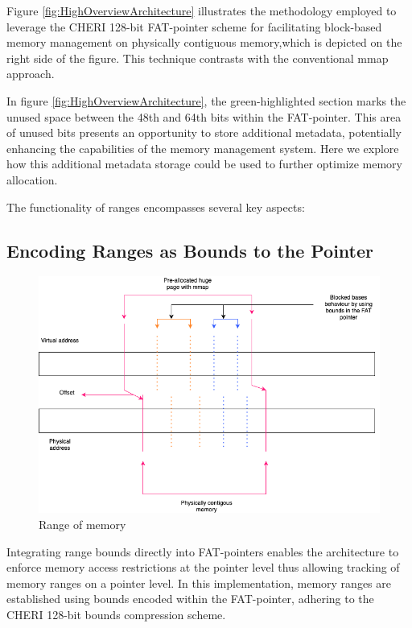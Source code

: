 \documentclass[11pt]{article}
\begin{document}
Figure \ref{fig:HighOverviewArchitecture} illustrates
the methodology employed to leverage the CHERI 
128-bit FAT-pointer scheme for facilitating
block-based memory management on physically
contiguous memory,which is depicted on the
right side of the figure. 
This technique contrasts with the
conventional mmap approach.

In figure \ref{fig:HighOverviewArchitecture}, the green-highlighted
section marks the unused space between the 48th and 64th bits
within the FAT-pointer. This area of unused bits
presents an opportunity to store additional metadata,
potentially enhancing the capabilities of the
memory management system. 
Here we explore how this additional
metadata storage could be used to further
optimize memory allocation.

The functionality of ranges encompasses
several key aspects:

\subsection{Encoding Ranges as Bounds to the Pointer}
\label{sec:org35c3d2b}
\begin{figure}[htbp]
\centering
\includegraphics[width=.9\linewidth]{diagram/AllocationOverview24.png}
\caption{\label{fig:org4c237f8}Range of memory}
\end{figure}

Integrating range bounds directly into FAT-pointers enables the architecture 
to enforce memory access restrictions at the pointer level thus allowing 
tracking of memory ranges on a pointer level. In this implementation, memory ranges are established using
bounds encoded within the FAT-pointer, adhering to the CHERI
128-bit bounds compression scheme\cite{woodruff_cheri_2019}.
\end{document}
